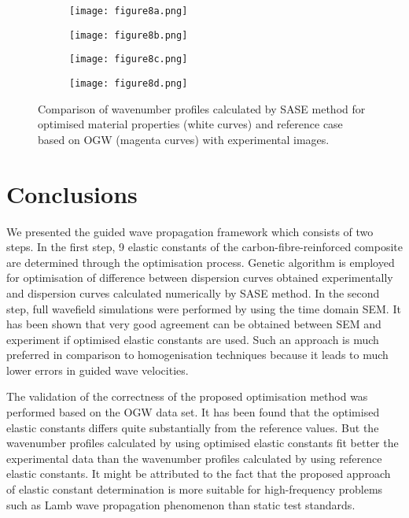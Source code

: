 \documentclass[preprint,12pt]{elsarticle}
\begin{document}
\begin{figure} [h!]
	\centering
	\begin{subfigure}[b]{0.47\textwidth}
		\centering
		\texttt{[image: figure8a.png]}
		\caption{}
		\label{fig:freq3_opt_Moll}
	\end{subfigure}
	\hfill
	\begin{subfigure}[b]{0.47\textwidth}
		\centering
		\texttt{[image: figure8b.png]}
		\label{fig:freq4_opt_Moll}
	\end{subfigure}
	\hfill
	\begin{subfigure}[b]{0.47\textwidth}
		\centering
		\texttt{[image: figure8c.png]}
		\label{fig:freq5_opt_Moll}
	\end{subfigure}
	\hfill
	\begin{subfigure}[b]{0.47\textwidth}
		\centering
		\texttt{[image: figure8d.png]}
		\label{fig:freq7_opt_Moll}
	\end{subfigure}
	\caption{Comparison of wavenumber profiles calculated by SASE method for optimised material properties (white curves) and reference case based on OGW (magenta curves) with experimental images.}
	\label{fig:freq_slice_opt_Moll}
\end{figure}
\clearpage
\section{Conclusions}
We presented the guided wave propagation framework which consists of two steps. 
In the first step, 9 elastic constants of the carbon-fibre-reinforced composite are determined through the optimisation process. 
Genetic algorithm is employed for optimisation of difference between dispersion curves obtained experimentally and dispersion curves calculated numerically by SASE method.
In the second step, full wavefield simulations were performed by using the time domain SEM. 
It has been shown that very good agreement can be obtained between SEM and experiment if optimised elastic constants are used. 
Such an approach is much preferred in comparison to homogenisation techniques because it leads to much lower errors in guided wave velocities.

The validation of the correctness of the proposed optimisation method was performed based on the OGW data set.
It has been found that the optimised elastic constants differs quite substantially from the reference values. 
But the wavenumber profiles calculated by using optimised elastic constants fit better the experimental data than the wavenumber profiles calculated by using reference elastic constants.
It might be attributed to the fact that the proposed approach of elastic constant determination is more suitable for high-frequency problems such as Lamb wave propagation phenomenon than static test standards.
\end{document}
